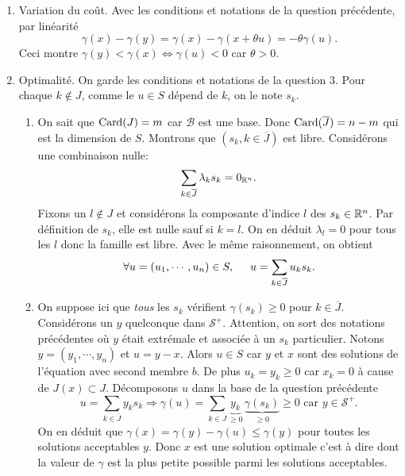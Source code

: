 \begin{enumerate}
  \item Variation du coût. Avec les conditions et notations de la question précédente, par linéarité
\[
  \gamma(x) - \gamma(y) = \gamma(x) - \gamma(x + \theta u) = -\theta \gamma(u).
\]
Ceci montre $\gamma(y) < \gamma(x) \Leftrightarrow \gamma(u) < 0$ car $\theta > 0$.

  \item Optimalité. On garde les conditions et notations de la question 3.\newline
   Pour chaque $k \notin J$, comme le $u \in S$ dépend de $k$, on le note $s_k$. 
\begin{enumerate}
  \item On sait que $\operatorname{Card}(J) = m$ car $\mathcal{B}$ est une base. Donc $\operatorname{Card}(\overline{J}) = n-m$ qui est la dimension de $S$. Montrons que $\left(s_k, k\in \overline{J}\right)$ est libre.\newline
Considérons une combinaison nulle:
\[
  \sum_{k \in \overline{J}} \lambda_k s_k = 0_{\mathbb{R}^n}.
\]
Fixons un $l \notin J$ et considérons la composante d'indice $l$ des $s_k \in \mathbb{R}^n$. Par définition de $s_k$, elle est nulle sauf si $k=l$. On en déduit $\lambda_l = 0$ pour tous les $l$ donc la famille est libre. Avec le même raisonnement, on obtient
\[
  \forall u =(u_1,\cdots,u_n) \in S, \hspace{0.5cm}
  u = \sum_{k \in \overline{J}} u_k s_k.
\]

  \item On suppose ici que \emph{tous} les $s_k$ vérifient $\gamma(s_k)\geq 0$ pour $k \in \overline{J}$.\newline
  Considérons un $y$ quelconque dans $\mathcal{S}^+$. Attention, on sort des notations précédentes où $y$ était extrémale et associée à un $s_k$ particulier.\newline
  Notons $y=(y_1, \cdots, y_n)$ et $u=y-x$.\newline
Alors $u \in S$ car $y$ et $x$ sont des solutions de l'équation avec second membre $b$.\newline
De plus $u_k = y_k \geq 0$ car $x_k=0$ à cause de $J(x) \subset J$. Décomposons $u$ dans la base de la question précédente
\[
  u = \sum_{k \in \overline{J}} y_k s_k \Rightarrow \gamma(u) = \sum_{k \in \overline{J}} \underset{\geq 0}{\underbrace{y_k}}\, \underset{\geq 0}{\underbrace{\gamma(s_k)}} \geq 0
  \text{ car } y \in \mathcal{S}^+.
\]
On en déduit que $\gamma(x) = \gamma(y) - \gamma(u) \leq \gamma(y)$ pour toutes les solutions acceptables $y$. Donc $x$ est une solution optimale c'est à dire dont la valeur de $\gamma$ est la plus petite possible parmi les solutions acceptables. 
\end{enumerate}


\end{enumerate}
